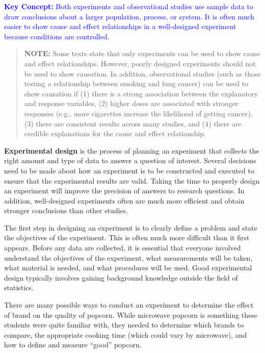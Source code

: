 \documentclass[
]{report}
\begin{document}
\textbf{\textcolor{blue}{Key Concept:}} \textcolor{blue}{Both experiments and observational studies use sample data to draw conclusions about a larger population, process, or system. It is often much easier to show cause and effect relationships in a well-designed experiment because conditions are controlled.}

\begin{quote}
\textbf{NOTE:} Some texts state that only experiments can be used to show cause and effect relationships. However, poorly designed experiments should not be used to show causation. In addition, observational studies (such as those testing a relationship between smoking and lung cancer) can be used to show causation if (1) there is a strong association between the explanatory and response variables, (2) higher doses are associated with stronger responses (e.g., more cigarettes increase the likelihood of getting cancer), (3) there are consistent results across many studies, and (4) there are credible explanations for the cause and effect relationship.
\end{quote}

\textbf{Experimental design} is the process of planning an experiment that collects the right amount and type of data to answer a question of interest. Several decisions need to be made about how an experiment is to be constructed and executed to ensure that the experimental results are valid. Taking the time to properly design an experiment will improve the precision of answers to research questions. In addition, well-designed experiments often are much more efficient and obtain stronger conclusions than other studies.

The first step in designing an experiment is to clearly define a problem and state the objectives of the experiment. This is often much more difficult than it first appears. Before any data are collected, it is essential that everyone involved understand the objectives of the experiment, what measurements will be taken, what material is needed, and what procedures will be used. Good experimental design typically involves gaining background knowledge outside the field of statistics.

There are many possible ways to conduct an experiment to determine the effect of brand on the quality of popcorn. While microwave popcorn is something these students were quite familiar with, they needed to determine which brands to compare, the appropriate cooking time (which could vary by microwave), and how to define and measure ``good'' popcorn.
\end{document}
